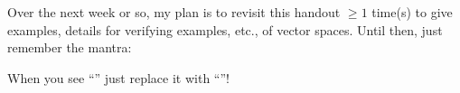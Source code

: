 \documentclass[12 pt]{article}
\begin{document}
\vspace{-6mm}

Over the next week or so, my plan is to revisit this handout $\geq 1$ time(s) to give examples, details for verifying examples, etc., of vector spaces. Until then, just remember the mantra:

\begin{center}
	\huge{When you see ``'' just replace it with ``''!}
\end{center}

%
\end{document}
